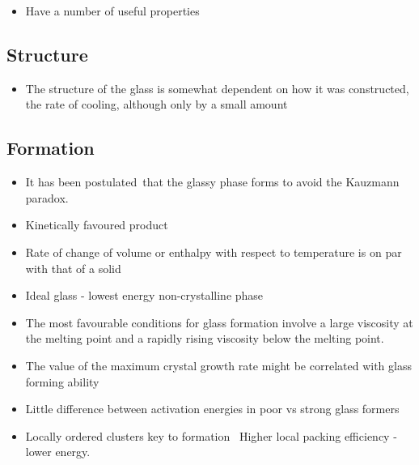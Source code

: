 {\begin{itemize}

    \item Have a number of useful properties~\cite{greer:07}
\end{itemize}

\subsection{Structure}
\begin{itemize}

    \item The structure of the glass is somewhat dependent on how it was constructed, the rate of cooling, although only by a small amount

\end{itemize}

\subsection{Formation}

\begin{itemize}
    \item It has been postulated~\tocite that the glassy phase forms to avoid the Kauzmann paradox. 

    \item Kinetically favoured product
    \item Rate of change of volume or enthalpy with respect to temperature is on par with that of a solid
    \item Ideal glass - lowest energy non-crystalline phase

    \item The most favourable conditions for glass formation involve a large viscosity at the melting point and a rapidly rising viscosity below the melting point.~\cite{uhlmann:72}



    \item The value of the maximum crystal growth rate might be correlated with glass forming ability~\cite{tang:13}

    \item Little difference between activation energies in poor vs strong glass formers~\cite{tang:13}

    \item Locally ordered clusters key to formation~\cite{yang:12} Higher local packing efficiency - lower energy. 
\end{itemize}

}

